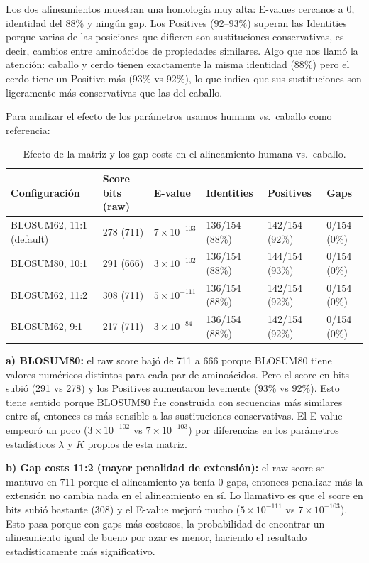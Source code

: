 Los dos alineamientos muestran una homología muy alta: E-values cercanos a 0, identidad del 88\% y ningún
gap. Los Positives (92--93\%) superan las Identities porque varias de las posiciones que difieren son
sustituciones conservativas, es decir, cambios entre aminoácidos de propiedades similares. Algo que nos
llamó la atención: caballo y cerdo tienen exactamente la misma identidad (88\%) pero el cerdo tiene un
Positive más (93\% vs 92\%), lo que indica que sus sustituciones son ligeramente más conservativas que las
del caballo.

Para analizar el efecto de los parámetros usamos humana vs.\ caballo como referencia:

\begin{table}[H]
\centering
\footnotesize
\begin{tabular}{lP{2.2cm}P{2.4cm}P{2.4cm}P{2.4cm}P{1.8cm}}
\toprule
Configuración & Score bits (raw) & E-value & Identities & Positives & Gaps \\
\midrule
BLOSUM62, 11:1 (default) & 278 (711) & $7 \times 10^{-103}$ & 136/154 (88\%) & 142/154 (92\%) & 0/154 (0\%) \\
BLOSUM80, 10:1           & 291 (666) & $3 \times 10^{-102}$ & 136/154 (88\%) & 144/154 (93\%) & 0/154 (0\%) \\
BLOSUM62, 11:2           & 308 (711) & $5 \times 10^{-111}$ & 136/154 (88\%) & 142/154 (92\%) & 0/154 (0\%) \\
BLOSUM62, 9:1            & 217 (711) & $3 \times 10^{-84}$  & 136/154 (88\%) & 142/154 (92\%) & 0/154 (0\%) \\
\bottomrule
\end{tabular}
\caption{Efecto de la matriz y los gap costs en el alineamiento humana vs.\ caballo.}
\end{table}

\textbf{a) BLOSUM80:} el raw score bajó de 711 a 666 porque BLOSUM80 tiene valores numéricos distintos
para cada par de aminoácidos. Pero el score en bits subió (291 vs 278) y los Positives aumentaron
levemente (93\% vs 92\%). Esto tiene sentido porque BLOSUM80 fue construida con secuencias más similares
entre sí, entonces es más sensible a las sustituciones conservativas. El E-value empeoró un poco
($3 \times 10^{-102}$ vs $7 \times 10^{-103}$) por diferencias en los parámetros estadísticos
$\lambda$ y $K$ propios de esta matriz.

\textbf{b) Gap costs 11:2 (mayor penalidad de extensión):} el raw score se mantuvo en 711 porque el
alineamiento ya tenía 0 gaps, entonces penalizar más la extensión no cambia nada en el alineamiento en sí.
Lo llamativo es que el score en bits subió bastante (308) y el E-value mejoró mucho
($5 \times 10^{-111}$ vs $7 \times 10^{-103}$). Esto pasa porque con gaps más costosos, la probabilidad
de encontrar un alineamiento igual de bueno por azar es menor, haciendo el resultado estadísticamente
más significativo.

